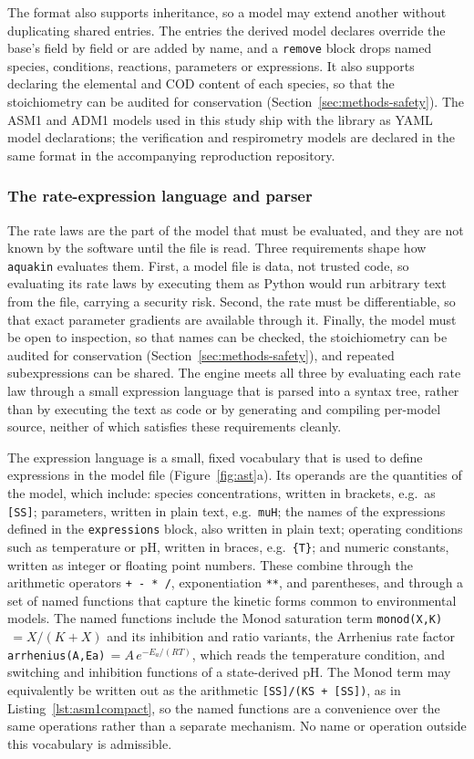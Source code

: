 \documentclass{article}
\begin{document}
The format also supports inheritance, so a model may extend another without duplicating shared entries. The entries the derived model declares override the base's field by field or are added by name, and a \texttt{remove} block drops named species, conditions, reactions, parameters or expressions. It also supports declaring the elemental and COD content of each species, so that the stoichiometry can be audited for conservation (Section~\ref{sec:methods-safety}). The ASM1 and ADM1 models used in this study ship with the library as YAML model declarations; the verification and respirometry models are declared in the same format in the accompanying reproduction repository.

\subsubsection{The rate-expression language and parser}
\label{sec:methods-parser}

The rate laws are the part of the model that must be evaluated, and they are not known by the software until the file is read. Three requirements shape how \texttt{aquakin} evaluates them. First, a model file is data, not trusted code, so evaluating its rate laws by executing them as Python would run arbitrary text from the file, carrying a security risk. Second, the rate must be differentiable, so that exact parameter gradients are available through it. Finally, the model must be open to inspection, so that names can be checked, the stoichiometry can be audited for conservation (Section~\ref{sec:methods-safety}), and repeated subexpressions can be shared. The engine meets all three by evaluating each rate law through a small expression language that is parsed into a syntax tree, rather than by executing the text as code or by generating and compiling per-model source, neither of which satisfies these requirements cleanly.

The expression language is a small, fixed vocabulary that is used to define expressions in the model file (Figure~\ref{fig:ast}a). Its operands are the quantities of the model, which include: species concentrations, written in brackets, e.g.\ as \texttt{[SS]}; parameters, written in plain text, e.g.\ \texttt{muH}; the names of the expressions defined in the \texttt{expressions} block, also written in plain text; operating conditions such as temperature or pH, written in braces, e.g.\ \texttt{\{T\}}; and numeric constants, written as integer or floating point numbers. These combine through the arithmetic operators \texttt{+ - * /}, exponentiation \texttt{**}, and parentheses, and through a set of named functions that capture the kinetic forms common to environmental models. The named functions include the Monod saturation term \texttt{monod(X,K)}$\,=X/(K+X)$ and its inhibition and ratio variants, the Arrhenius rate factor \texttt{arrhenius(A,Ea)}$\,=A\,e^{-E_a/(RT)}$, which reads the temperature condition, and switching and inhibition functions of a state-derived pH. The Monod term may equivalently be written out as the arithmetic \texttt{[SS]/(KS + [SS])}, as in Listing~\ref{lst:asm1compact}, so the named functions are a convenience over the same operations rather than a separate mechanism. No name or operation outside this vocabulary is admissible.
\end{document}
